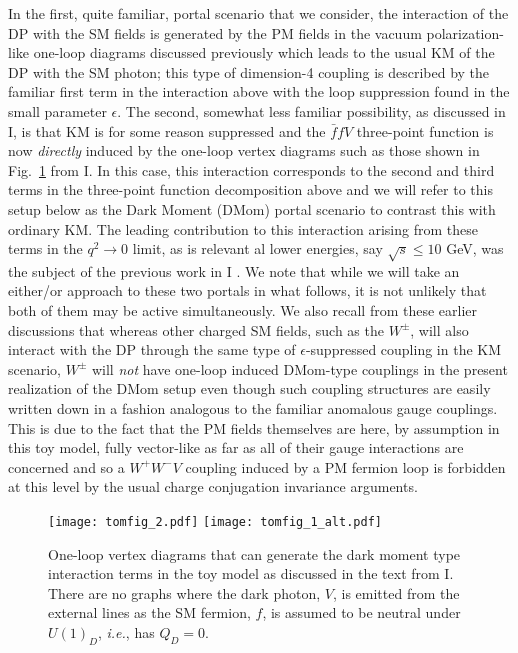 \documentclass[14pt]{article}
\def\ie{{\it i.e.}}
\def\to{\rightarrow}
\begin{document}
In the first, quite familiar, portal scenario that we consider, the interaction of the DP with the SM fields is generated by the PM fields in the vacuum polarization-like one-loop diagrams 
discussed previously which leads to the usual KM of the DP with the SM photon; this type of dimension-4 coupling is described by the familiar first term in the interaction above with the loop suppression 
found in the small parameter $\epsilon$. The second, somewhat less familiar possibility,  as discussed in I\cite{Rizzo:2021lob}, is that KM is for some reason suppressed and the $\bar ffV$ 
three-point function is now {\it directly} induced by the one-loop vertex diagrams such as those shown in Fig.~\ref{fig1} from I. In this case, this interaction corresponds to the second and third terms 
in the three-point function decomposition above and we will refer to this setup below as the Dark Moment (DMom) 
portal scenario to contrast this with ordinary KM. The leading contribution to this interaction arising from these terms in the $q^2\to 0$ limit, as is relevant al lower energies, say 
$\sqrt s \leq 10$ GeV, was the subject of 
the previous work in I \cite{Rizzo:2021lob}. We note that while we will take an either/or approach to these two portals in what follows, it is not unlikely that both of them may be active simultaneously. We 
also recall from these earlier discussions that whereas other charged SM fields, such as the $W^\pm$, will also interact with the DP through the same type of  $\epsilon$-suppressed coupling in the 
KM scenario,  $W^\pm$ will {\it not} have one-loop induced DMom-type couplings in the present realization of the DMom setup even though such coupling structures are easily written down in 
a fashion analogous to the familiar anomalous gauge couplings. This is due to the fact that the PM fields themselves are here, by assumption in this toy model, fully vector-like as far as all of their 
gauge interactions are concerned and so a $W^+W^-V$ coupling induced by a PM fermion loop is forbidden at this level by the usual charge conjugation invariance arguments. 


%
\begin{figure}[htbp]
\centerline{\texttt{[image: tomfig\_2.pdf]}
\hspace{1.0cm}
\vspace {1.5cm}
\texttt{[image: tomfig\_1\_alt.pdf]}}
\vspace*{-0.40cm}
\caption{One-loop vertex diagrams that can generate the dark moment type interaction terms in the toy model as discussed in the text from I. There are no graphs where the dark photon, $V$, is 
emitted from the external lines as the SM fermion, $f$, is assumed to be neutral under $U(1)_D$, \ie, has $Q_D=0$.}
\label{fig1}
\end{figure}
%
\end{document}
